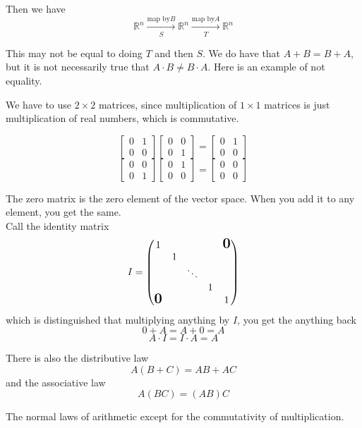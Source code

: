 \documentclass[12pt]{article}
\newcommand{\RR}{\mathbb{R}}
\theoremstyle{definition}
\begin{document}
Then we have
\[\RR^n\xrightarrow[S]{\text{map by} B}\RR^n\xrightarrow[T]{\text{map by} A}\RR^n\]

This may not be equal to doing \(T\) and then \(S\). We do have
that \(A + B = B + A\), but it is not necessarily true that
\(A \cdot B \neq B \cdot A\). Here is an example of not equality.

We have to use \(2 \times 2\) matrices, since multiplication of
\(1 \times 1\) matrices is just multiplication of real numbers, which is
commutative.

\[
\begin{bmatrix}
    0 & 1\\
    0 & 0
\end{bmatrix}
\begin{bmatrix}
    0 & 0\\
    0 & 1
\end{bmatrix} =
\begin{bmatrix}
    0 & 1\\
    0 & 0
\end{bmatrix}\]
\[
\begin{bmatrix}
    0 & 0\\
    0 & 1
\end{bmatrix}
\begin{bmatrix}
    0 & 1\\
    0 & 0
\end{bmatrix} =
\begin{bmatrix}
    0 & 0\\
    0 & 0
\end{bmatrix}
\]

The zero matrix is the zero element of the vector space.
When you add it to any element, you get the same.
\\

Call the identity matrix
\[I = \begin{pmatrix}
1 & & & & \mbox{\normalfont\Large\bfseries 0}\\
& 1 & & & \\
& & \ddots & & \\
& & & 1 & \\
\mbox{\normalfont\Large\bfseries 0} & & & & 1
\end{pmatrix}\]
which is distinguished that multiplying anything by \( I \),
you get the anything back
\[0 + A = A + 0 = A\]
\[A\cdot I = I \cdot A = A\]

There is also the distributive law
\[A(B+C) = AB + AC\]
and the associative law
\[A(BC) = (AB)C\]

The normal laws of arithmetic except for the commutativity of multiplication.
\end{document}
